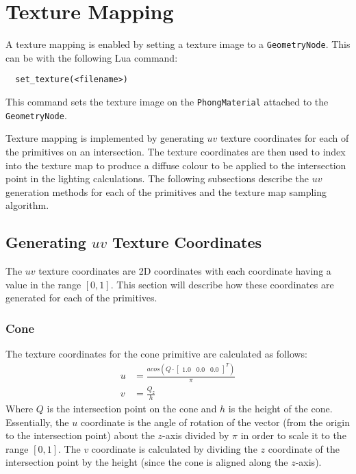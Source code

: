 \section{Texture Mapping}

A texture mapping is enabled by setting a texture image to a
\newline \verb|GeometryNode|. This can be with the following Lua 
command:
\begin{lstlisting}
  set_texture(<filename>)
\end{lstlisting}
This command sets the texture image on the \verb|PhongMaterial| attached to the
\verb|GeometryNode|. 

Texture mapping is implemented by generating $uv$ texture coordinates for each
of the primitives on an intersection. The texture coordinates are then used to
index into the texture map to produce a diffuse colour to be applied to the
intersection point in the lighting calculations. The following subsections
describe the $uv$ generation methods for each of the primitives and the texture
map sampling algorithm.

\subsection{Generating $uv$ Texture Coordinates}

The $uv$ texture coordinates are 2D coordinates with each coordinate having a
value in the range $[0, 1]$. This section will describe how these coordinates
are generated for each of the primitives.

\subsubsection*{Cone}
The texture coordinates for the cone primitive are calculated as follows:
\begin{equation}
\begin{split}
  u &= \frac{acos(Q \cdot \begin{bmatrix} 1.0 & 0.0 & 0.0 \end{bmatrix}^{T})}
  {\pi} \\
  v &= \frac{Q_{z}}{h}
\end{split}
\end{equation}
Where $Q$ is the intersection point on the cone and $h$ is the height of the
cone. Essentially, the $u$ coordinate is the angle of rotation of the vector 
(from the origin to the intersection point) about the $z$-axis divided by $\pi$ 
in order to scale it to the range $[0, 1]$. The $v$ coordinate is calculated by
dividing the $z$ coordinate of the intersection point by the height (since the
cone is aligned along the $z$-axis).

